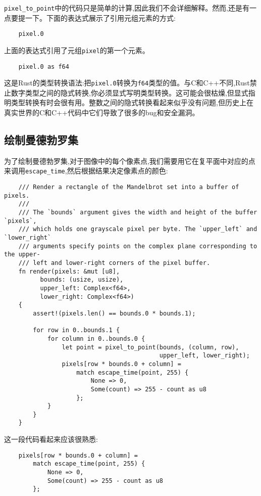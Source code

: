 \texttt{pixel\_to\_point}中的代码只是简单的计算,因此我们不会详细解释。然而,还是有一点要提一下。下面的表达式展示了引用元组元素的方式:
\begin{verbatim}
    pixel.0
\end{verbatim}
上面的表达式引用了元组\texttt{pixel}的第一个元素。

\begin{verbatim}
    pixel.0 as f64
\end{verbatim}

这是Rust的类型转换语法:把\texttt{pixel.0}转换为\texttt{f64}类型的值。与C和C++不同,Rust禁止数字类型之间的隐式转换,你必须显式写明类型转换。这可能会很枯燥,但显式指明类型转换有时会很有用。整数之间的隐式转换看起来似乎没有问题,但历史上在真实世界的C和C++代码中它们导致了很多的bug和安全漏洞。

\subsection{绘制曼德勃罗集}
为了绘制曼德勃罗集,对于图像中的每个像素点,我们需要用它在复平面中对应的点来调用\texttt{escape\_time},然后根据结果决定像素点的颜色:
\begin{verbatim}
    /// Render a rectangle of the Mandelbrot set into a buffer of pixels.
    ///
    /// The `bounds` argument gives the width and height of the buffer `pixels`,
    /// which holds one grayscale pixel per byte. The `upper_left` and `lower_right`
    /// arguments specify points on the complex plane corresponding to the upper-
    /// left and lower-right corners of the pixel buffer.
    fn render(pixels: &mut [u8],
          bounds: (usize, usize),
          upper_left: Complex<f64>,
          lower_right: Complex<f64>)
    {
        assert!(pixels.len() == bounds.0 * bounds.1);

        for row in 0..bounds.1 {
            for column in 0..bounds.0 {
                let point = pixel_to_point(bounds, (column, row),
                                           upper_left, lower_right);
                pixels[row * bounds.0 + column] = 
                    match escape_time(point, 255) {
                        None => 0,
                        Some(count) => 255 - count as u8
                    };
            }
        }
    }
\end{verbatim}

这一段代码看起来应该很熟悉:
\begin{verbatim}
    pixels[row * bounds.0 + column] =
        match escape_time(point, 255) {
            None => 0,
            Some(count) => 255 - count as u8
        };
\end{verbatim}

